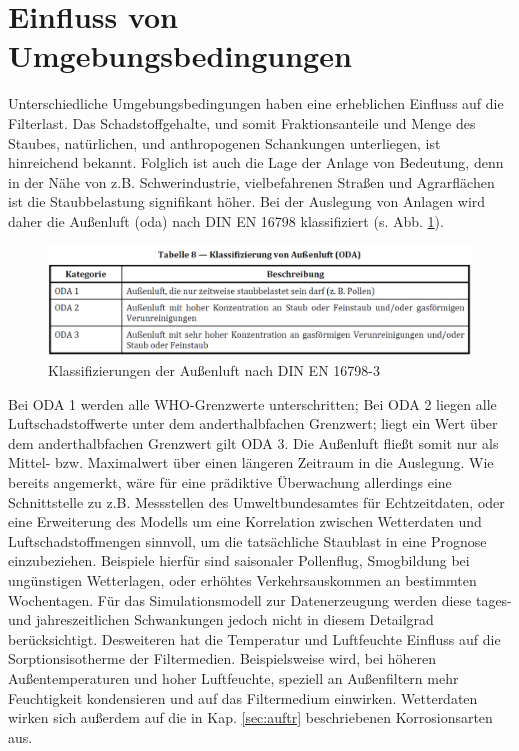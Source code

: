     \section{Einfluss von Umgebungsbedingungen}
    \label{sec:umweltbed}
    Unterschiedliche Umgebungsbedingungen haben eine erheblichen Einfluss auf die Filterlast. Das Schadstoffgehalte, und somit Fraktionsanteile und Menge des Staubes, natürlichen, und anthropogenen Schankungen unterliegen, ist hinreichend bekannt.
    Folglich ist auch die Lage der Anlage von Bedeutung, denn in der Nähe von z.B. Schwerindustrie, vielbefahrenen Straßen und Agrarflächen ist die Staubbelastung signifikant höher. Bei der Auslegung von Anlagen wird daher die Außenluft (\ac{oda}) nach DIN EN 16798 \cite{16798} klassifiziert (s. Abb. \ref{fi:oda_class}).
    \begin{figure}[H]
        \begin{center}
            \includegraphics[width=\linewidth]{images/oda_class.png}
            \caption[Klassifizierung von Außenluft]{Klassifizierungen der Außenluft nach DIN EN 16798-3 \cite{16798} }
            \label{fi:oda_class}
        \end{center}
    \end{figure} 
    Bei ODA 1 werden alle WHO-Grenzwerte unterschritten; Bei ODA 2 liegen alle Luftschadstoffwerte unter dem anderthalbfachen Grenzwert; liegt ein Wert über dem anderthalbfachen Grenzwert gilt ODA 3. Die Außenluft fließt somit nur als Mittel- bzw. Maximalwert über einen längeren Zeitraum in die Auslegung. Wie bereits angemerkt, wäre für eine prädiktive Überwachung allerdings eine Schnittstelle zu z.B. Messstellen des Umweltbundesamtes für Echtzeitdaten, oder eine Erweiterung des Modells um eine Korrelation zwischen Wetterdaten und Luftschadstoffmengen sinnvoll, um die tatsächliche Staublast in eine Prognose einzubeziehen. Beispiele hierfür sind saisonaler Pollenflug, Smogbildung bei ungünstigen Wetterlagen, oder erhöhtes Verkehrsauskommen an bestimmten Wochentagen. Für das Simulationsmodell zur Datenerzeugung werden diese tages- und jahreszeitlichen Schwankungen jedoch nicht in diesem Detailgrad berücksichtigt.
    Desweiteren hat die Temperatur und Luftfeuchte Einfluss auf die Sorptionsisotherme der Filtermedien. Beispielsweise wird, bei höheren Außentemperaturen und hoher Luftfeuchte, speziell an Außenfiltern mehr Feuchtigkeit kondensieren und auf das Filtermedium einwirken. Wetterdaten wirken sich außerdem auf die in Kap. \ref{sec:auftr} beschriebenen Korrosionsarten aus.


 